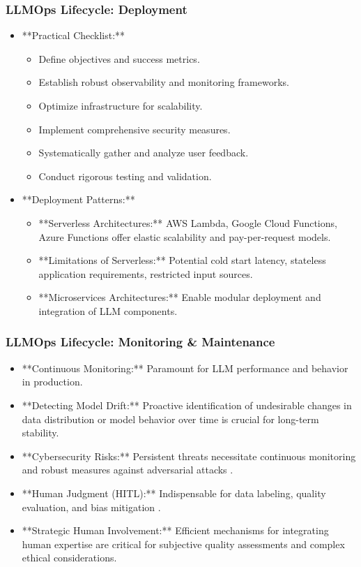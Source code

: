 \documentclass{beamer}       %
\begin{document}
\begin{frame}
    \frametitle{LLMOps Lifecycle: Deployment}
    \begin{itemize}
        \item **Practical Checklist:**
        \begin{itemize}
            \item Define objectives and success metrics.
            \item Establish robust observability and monitoring frameworks.
            \item Optimize infrastructure for scalability.
            \item Implement comprehensive security measures.
            \item Systematically gather and analyze user feedback.
            \item Conduct rigorous testing and validation.
        \end{itemize}
        \item **Deployment Patterns:**
        \begin{itemize}
            \item **Serverless Architectures:** AWS Lambda, Google Cloud Functions, Azure Functions offer elastic scalability and pay-per-request models.
            \item **Limitations of Serverless:** Potential cold start latency, stateless application requirements, restricted input sources.
            \item **Microservices Architectures:** Enable modular deployment and integration of LLM components.
        \end{itemize}
    \end{itemize}
\end{frame}

\begin{frame}
    \frametitle{LLMOps Lifecycle: Monitoring \& Maintenance}
    \begin{itemize}
        \item **Continuous Monitoring:** Paramount for LLM performance and behavior in production.
        \item **Detecting Model Drift:** Proactive identification of undesirable changes in data distribution or model behavior over time is crucial for long-term stability.
        \item **Cybersecurity Risks:** Persistent threats necessitate continuous monitoring and robust measures against adversarial attacks .
        \item **Human Judgment (HITL):** Indispensable for data labeling, quality evaluation, and bias mitigation .
        \item **Strategic Human Involvement:** Efficient mechanisms for integrating human expertise are critical for subjective quality assessments and complex ethical considerations.
    \end{itemize}
\end{frame}
\end{document}
